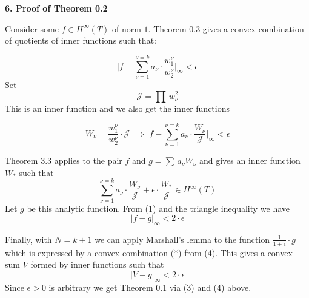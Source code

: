 \documentclass{amsart}
\begin{document}
\bigskip

\centerline{\bf{6. Proof of Theorem 0.2}}
\bigskip

\noindent
Consider some
$f\in H^\infty(T)$ of  norm $1$.
Theorem 0.3 gives a convex combination of quotients of
inner functions such that:

\[ 
\bigl|f-\sum_{\nu=1}^{\nu=k} a_\nu\cdot\frac{w_1^\nu}{w_2^\nu}\bigr|_\infty<\epsilon
\]
Set
\[ 
\mathcal J=\prod\, w_\nu^2
\]
This is an inner function and we also get the inner functions

\[ 
W_\nu= \frac{w_1^\nu}{w_2^\nu}\cdot\mathcal J\implies
\bigl|f-\sum_{\nu=1}^{\nu=k} a_\nu\cdot\frac{W_\nu}{\mathcal J}
\bigr|_\infty<\epsilon\tag{1}
\]


\medskip




\noindent
Theorem 3.3 applies to the pair $f$ and $g=\sum\, a_\nu W_\nu$
and gives an inner function $W_*$ such that 
\[ 
\sum_{\nu=1}^{\nu=k} a_\nu\cdot\frac{W_\nu}{\mathcal J}+\epsilon\cdot\frac {W_*}{\mathcal J}\in
H^\infty(T)\tag{2}
\]
Let $g$ be this analytic function. From (1) and the triangle inequality we have
\[
|f-g|_\infty<2\cdot \epsilon\tag{3}
\]

\noindent
Finally, with $N=k+1$ we can apply Marshall's lemma to
the function $\frac{1}{1+\epsilon}\cdot g$
which is expressed by a convex combination
(*) from (4).
This gives a convex sum $V$ formed by inner functions such that
\[ 
|V-g|_\infty<2\cdot\epsilon\tag{4}
\]
Since $\epsilon>0$ is arbitrary
we get Theorem 0.1 via (3) and (4) above.







\newpage
\end{document}
